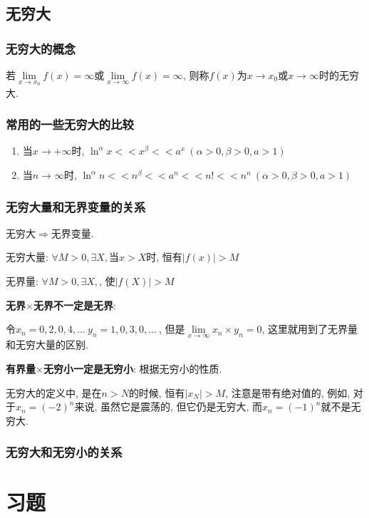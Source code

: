 \subsection{无穷大}
\subsubsection{无穷大的概念}
若$ \lim\limits_{x \rightarrow x_{0}}f(x)=\infty $或$ \lim\limits_{x \rightarrow \infty}f(x)=\infty $, 则称$ f(x) $为$ x\rightarrow x_{0} $或$ x\rightarrow \infty $时的无穷大.
\subsubsection{常用的一些无穷大的比较}
\begin{enumerate}
\item 当$ x\rightarrow +\infty $时, $ \ln^{\alpha}x<<x^{\beta}<<a^{x}\ (\alpha>0, \beta>0, a>1) $
\item 当$ n\rightarrow \infty $时, $ \ln^{\alpha}n<<n^{\beta}<<a^{n}<<n!<<n^{n}\ (\alpha>0, \beta>0, a>1) $
\end{enumerate}
\subsubsection{无穷大量和无界变量的关系}
无穷大$ \Rightarrow $无界变量.\par
无穷大量: $ \forall M>0, \exists X, $当$ x>X $时, 恒有$ |f(x)|>M $ \par
无界量: $ \forall M>0, \exists X, $, 使$ |f(X)|>M $
\begin{tcolorbox}
\textbf{无界$ \times $无界不一定是无界}:\par 令$ x_{n}=0,2,0,4,...\ y_{n}=1,0,3,0,...\ $, 但是$ \lim\limits_{x \rightarrow \infty}x_{n}\times y_{n}=0 $, 这里就用到了无界量和无穷大量的区别.\par \vspace{.5em}
\textbf{有界量$ \times $无穷小一定是无穷小}: 根据无穷小的性质.\par \vspace{.5em}
无穷大的定义中, 是在$ n>N $的时候, 恒有$ |x_{N}|>M $, 注意是带有绝对值的, 例如, 对于$ x_{n}=(-2)^{n} $来说, 虽然它是震荡的, 但它仍是无穷大, 而$ x_{n}=(-1)^{n} $就不是无穷大.
\end{tcolorbox}
\subsubsection{无穷大和无穷小的关系}
\section{习题}
